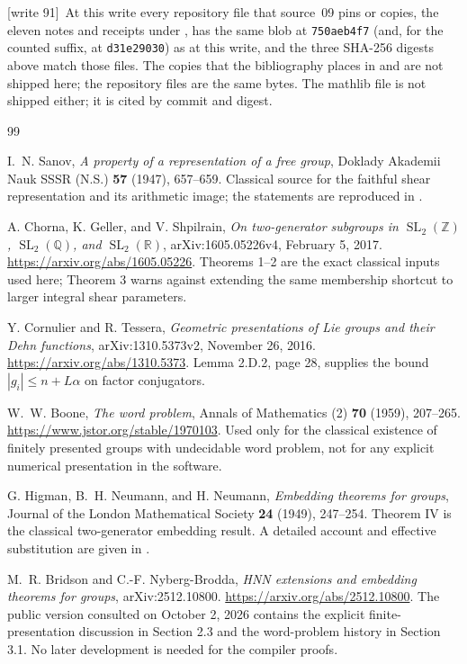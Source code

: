 \documentclass[11pt,letterpaper]{article}
\theoremstyle{definition}
\theoremstyle{remark}
\newcommand{\Z}{\mathbb Z}
\newcommand{\SL}{\operatorname{SL}}
\newcommand{\wtagd}{\textup{[write 91]}}
\begin{document}
\wtagd\ At this write every repository file that source~09 pins or copies, the eleven notes and receipts under , has the same blob at \texttt{750aeb4f7} (and, for the counted suffix, at \texttt{d31e29030}) as at this write, and the three SHA-256 digests above match those files. The copies that the bibliography places in  and  are not shipped here; the repository files are the same bytes. The mathlib file is not shipped either; it is cited by commit and digest.

\clearpage
{}
\begin{thebibliography}{99}

I.~N. Sanov,
\emph{A property of a representation of a free group},
Doklady Akademii Nauk SSSR (N.S.) \textbf{57} (1947), 657--659.
Classical source for the faithful shear representation and its arithmetic image; the statements are reproduced in \cite{chorna}.

A. Chorna, K. Geller, and V. Shpilrain,
\emph{On two-generator subgroups in $\SL_2(\Z)$, $\SL_2(\mathbb Q)$, and $\SL_2(\mathbb R)$},
arXiv:1605.05226v4, February 5, 2017.
\url{https://arxiv.org/abs/1605.05226}.
Theorems 1--2 are the exact classical inputs used here; Theorem 3 warns against extending the same membership shortcut to larger integral shear parameters.

Y. Cornulier and R. Tessera,
\emph{Geometric presentations of Lie groups and their Dehn functions},
arXiv:1310.5373v2, November 26, 2016.
\url{https://arxiv.org/abs/1310.5373}.
Lemma 2.D.2, page 28, supplies the bound $|g_i|\leq n+L\alpha$ on factor conjugators.

W.~W. Boone,
\emph{The word problem},
Annals of Mathematics (2) \textbf{70} (1959), 207--265.
\url{https://www.jstor.org/stable/1970103}.
Used only for the classical existence of finitely presented groups with undecidable word problem, not for any explicit numerical presentation in the software.

G. Higman, B.~H. Neumann, and H. Neumann,
\emph{Embedding theorems for groups},
Journal of the London Mathematical Society \textbf{24} (1949), 247--254.
Theorem IV is the classical two-generator embedding result. A detailed account and effective substitution are given in \cite{bridson}.

M.~R. Bridson and C.-F. Nyberg-Brodda,
\emph{HNN extensions and embedding theorems for groups},
arXiv:2512.10800.
\url{https://arxiv.org/abs/2512.10800}.
The public version consulted on October 2, 2026 contains the explicit finite-presentation discussion in Section 2.3 and the word-problem history in Section 3.1. No later development is needed for the compiler proofs.


\end{thebibliography}
\end{document}
